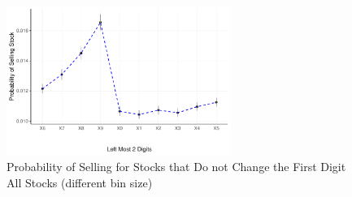 \begin{figure}[hbt!]
	\centering%
	\caption{Probability of Selling  for Stocks that Do not Change the First Digit \\ All Stocks (different bin size)}%
	\label{fig:prob_all_dec}%
	\includegraphics[width=0.65\textwidth]{figures/Left2decrease_probCI.pdf}
	\fignote{}
\end{figure}


